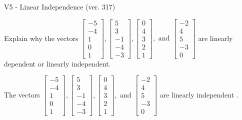 \begin{exercise}
  \begin{exerciseTitle}V5 - Linear Independence (ver. 317)\end{exerciseTitle}
  \begin{exerciseStatement}
    Explain why the vectors \(\left[\begin{array}{r}
-5 \\
-4 \\
1 \\
0 \\
1
\end{array}\right] , \left[\begin{array}{r}
5 \\
3 \\
-1 \\
-4 \\
-3
\end{array}\right] , \left[\begin{array}{r}
0 \\
4 \\
3 \\
2 \\
1
\end{array}\right] , \text{ and } \left[\begin{array}{r}
-2 \\
4 \\
5 \\
-3 \\
0
\end{array}\right]\) are linearly dependent or linearly independent.	


  \end{exerciseStatement}
  \begin{exerciseAnswer}
   The vectors \(\left[\begin{array}{r}
-5 \\
-4 \\
1 \\
0 \\
1
\end{array}\right] , \left[\begin{array}{r}
5 \\
3 \\
-1 \\
-4 \\
-3
\end{array}\right] , \left[\begin{array}{r}
0 \\
4 \\
3 \\
2 \\
1
\end{array}\right] , \text{ and } \left[\begin{array}{r}
-2 \\
4 \\
5 \\
-3 \\
0
\end{array}\right]\) are 
  	 linearly independent  .
  


  \end{exerciseAnswer}
\end{exercise}
